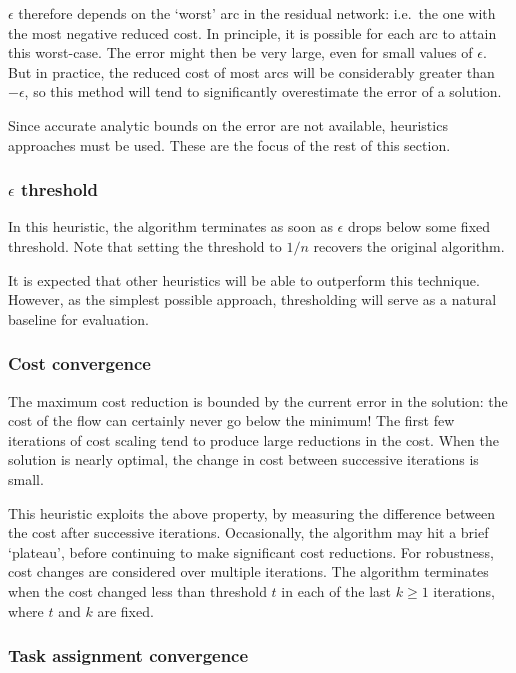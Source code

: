 $\epsilon$ therefore depends on the `worst' arc in the residual network: i.e.\ the one with the most negative reduced cost. In principle, it is possible for each arc to attain this worst-case. The error might then be very large, even for small values of $\epsilon$. But in practice, the reduced cost of most arcs will be considerably greater than $-\epsilon$, so this method will tend to significantly overestimate the error of a solution.

Since accurate analytic bounds on the error are not available, heuristics approaches must be used. These are the focus of the rest of this section.

\subsubsection{$\epsilon$ threshold}

In this heuristic, the algorithm terminates as soon as $\epsilon$ drops below some fixed threshold. Note that setting the threshold to $1/n$ recovers the original algorithm.

It is expected that other heuristics will be able to outperform this technique. However, as the simplest possible approach, thresholding will serve as a natural baseline for evaluation.

\subsubsection{Cost convergence}

The maximum cost reduction is bounded by the current error in the solution: the cost of the flow can certainly never go below the minimum! The first few iterations of cost scaling tend to produce large reductions in the cost. When the solution is nearly optimal, the change in cost between successive iterations is small.

This heuristic exploits the above property, by measuring the difference between the cost after successive iterations. Occasionally, the algorithm may hit a brief `plateau', before continuing to make significant cost reductions. For robustness, cost changes are considered over multiple iterations. The algorithm terminates when the cost changed less than threshold $t$ in each of the last $k \geq 1$ iterations, where $t$ and $k$ are fixed.

\subsubsection{Task assignment convergence}

